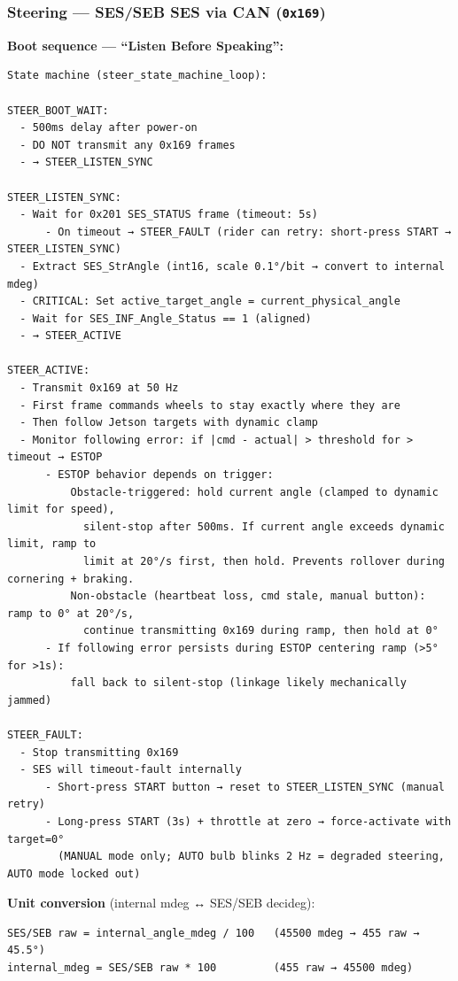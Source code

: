 \subsubsection{\texorpdfstring{Steering --- SES/SEB SES via CAN
(\texttt{0x169})}{Steering --- SES/SEB SES via CAN (0x169)}}\label{steering-SES/SEB-SES-via-can-0x169}

\textbf{Boot sequence --- ``Listen Before Speaking'':}

\begin{verbatim}
State machine (steer_state_machine_loop):

STEER_BOOT_WAIT:
  - 500ms delay after power-on
  - DO NOT transmit any 0x169 frames
  - → STEER_LISTEN_SYNC

STEER_LISTEN_SYNC:
  - Wait for 0x201 SES_STATUS frame (timeout: 5s)
      - On timeout → STEER_FAULT (rider can retry: short-press START → STEER_LISTEN_SYNC)
  - Extract SES_StrAngle (int16, scale 0.1°/bit → convert to internal mdeg)
  - CRITICAL: Set active_target_angle = current_physical_angle
  - Wait for SES_INF_Angle_Status == 1 (aligned)
  - → STEER_ACTIVE

STEER_ACTIVE:
  - Transmit 0x169 at 50 Hz
  - First frame commands wheels to stay exactly where they are
  - Then follow Jetson targets with dynamic clamp
  - Monitor following error: if |cmd - actual| > threshold for > timeout → ESTOP
      - ESTOP behavior depends on trigger:
          Obstacle-triggered: hold current angle (clamped to dynamic limit for speed),
            silent-stop after 500ms. If current angle exceeds dynamic limit, ramp to
            limit at 20°/s first, then hold. Prevents rollover during cornering + braking.
          Non-obstacle (heartbeat loss, cmd stale, manual button): ramp to 0° at 20°/s,
            continue transmitting 0x169 during ramp, then hold at 0°
      - If following error persists during ESTOP centering ramp (>5° for >1s):
          fall back to silent-stop (linkage likely mechanically jammed)

STEER_FAULT:
  - Stop transmitting 0x169
  - SES will timeout-fault internally
      - Short-press START button → reset to STEER_LISTEN_SYNC (manual retry)
      - Long-press START (3s) + throttle at zero → force-activate with target=0°
        (MANUAL mode only; AUTO bulb blinks 2 Hz = degraded steering, AUTO mode locked out)
\end{verbatim}

\textbf{Unit conversion} (internal mdeg ↔ SES/SEB decideg):

\begin{verbatim}
SES/SEB raw = internal_angle_mdeg / 100   (45500 mdeg → 455 raw → 45.5°)
internal_mdeg = SES/SEB raw * 100         (455 raw → 45500 mdeg)
\end{verbatim}

